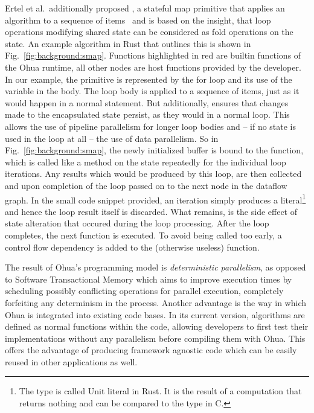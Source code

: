 Ertel et al.\ additionally proposed , a stateful map primitive that applies an algorithm to a sequence of items~\cite{ertel2019stclang} and is based on the insight, that loop operations modifying shared state can be considered as fold operations on the state.
An example algorithm in Rust that outlines this is shown in Fig.~\ref{fig:background:smap}.
Functions highlighted in red are builtin functions of the Ohua runtime, all other nodes are host functions provided by the developer.
In our example, the  primitive is represented by the for loop and its use of the  variable in the body.
The loop body is applied to a sequence of items, just as it would happen in a normal  statement.
But additionally,  ensures that changes made to the encapsulated state persist, as they would in a normal  loop.
This allows the use of pipeline parallelism for longer loop bodies and -- if no state is used in the loop at all -- the use of data parallelism.
So in Fig.~\ref{fig:background:smap}, the newly initialized buffer is bound to the  function, which is called like a method on the state repeatedly for the individual loop iterations.
Any results which would be produced by this loop, are then collected and upon completion of the loop passed on to the next node in the dataflow graph.
In the small code snippet provided, an iteration simply produces a \rust{()} literal\footnote{The \rust{()} type is called Unit literal in Rust. It is the result of a computation that returns nothing and can be compared to the  type in C.} and hence the loop result itself is discarded.
What remains, is the side effect of state alteration that occured during the loop processing.
After the loop completes, the next function is executed.
To avoid  being called too early, a control flow dependency is added to the (otherwise useless)  function.

The result of Ohua's programming model is \emph{deterministic parallelism}, as opposed to Software Transactional Memory which aims to improve execution times by scheduling possibly conflicting operations for parallel execution, completely forfeiting any determinism in the process.
Another advantage is the way in which Ohua is integrated into existing code bases.
In its current version, algorithms are defined as normal functions within the code, allowing developers to first test their implementations without any parallelism before compiling them with Ohua.
This offers the advantage of producing framework agnostic code which can be easily reused in other applications as well.

